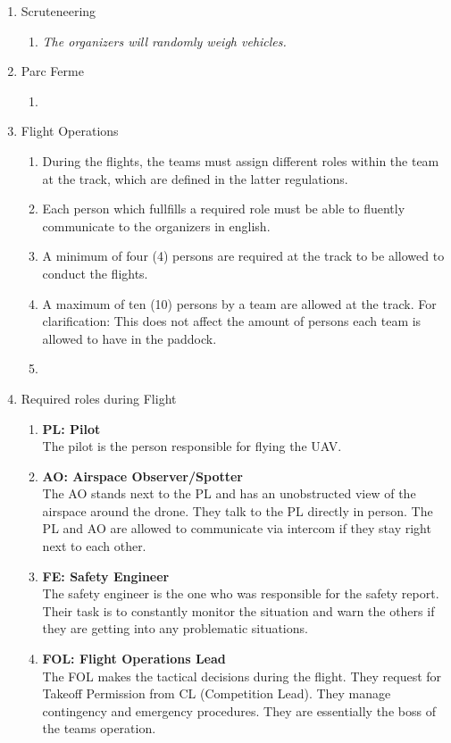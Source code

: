 \begin{enumerate}
    \item{Scruteneering}
    \begin{enumerate}
      \item \emph{The organizers will randomly weigh vehicles.}
    \end{enumerate}

    \item{Parc Ferme}
    \begin{enumerate}
      \item 
    \end{enumerate}

    \item{Flight Operations}
    \begin{enumerate}
      \item During the flights, the teams must assign different roles within the team at the track, which are defined in the latter regulations.
      \item Each person which fullfills a required role must be able to fluently communicate to the organizers in english.
      \item A minimum of four (4) persons are required at the track to be allowed to conduct the flights.
      \item A maximum of ten (10) persons by a team are allowed at the track. For clarification: This does not affect the amount of persons each team is allowed to have in the paddock. 
      \item 
    \end{enumerate}

    \item{Required roles during Flight}
    \begin{enumerate}
      \item \textbf{PL: Pilot}\\The pilot is the person responsible for flying the UAV.
      \item \textbf{AO: Airspace Observer/Spotter}\\The AO stands next to the PL and has an unobstructed view of the airspace around the drone. They talk to the PL directly in person. The PL and AO are allowed to communicate via intercom if they stay right next to each other. 
      \item \textbf{FE: Safety Engineer}\\The safety engineer is the one who was responsible for the safety report. Their task is to constantly monitor the situation and warn the others if they are getting into any problematic situations. 
      \item \textbf{FOL: Flight Operations Lead}\\The FOL makes the tactical decisions during the flight. They request for Takeoff Permission from CL (Competition Lead). They manage contingency and emergency procedures. They are essentially the boss of the teams operation.
    \end{enumerate}


\end{enumerate}
